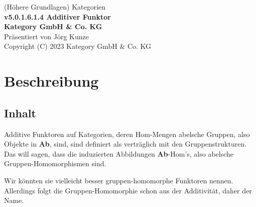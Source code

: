 \documentclass[a4paper]{amsart}
\theoremstyle{definition}
\begin{document}
\begin{titlepage}
\centering
{\huge
(Höhere Grundlagen) Kategorien\\[1cm]
\textbf{v5.0.1.6.1.4 Additiver Funktor}
}\\[1cm]

\textbf{Kategory GmbH \& Co. KG}\\
Präsentiert von Jörg Kunze\\
Copyright (C) 2023 Kategory GmbH \& Co. KG

\end{titlepage}

%

\newpage

\section*{Beschreibung}

\subsection*{Inhalt}
Additive Funktoren auf Kategorien, deren Hom-Mengen abelsche Gruppen, also Objekte in \textbf{Ab}, sind, sind definiert als verträglich mit den Gruppenstrukturen. Das will sagen, dass die induzierten Abbildungen \textbf{Ab}-Hom's, also abelsche Gruppen-Homomorphismen sind.

Wir könnten sie vielleicht besser gruppen-homomorphe Funktoren nennen. Allerdings folgt die Gruppen-Homomorphie schon aus der Additivität, daher der Name.
\end{document}
